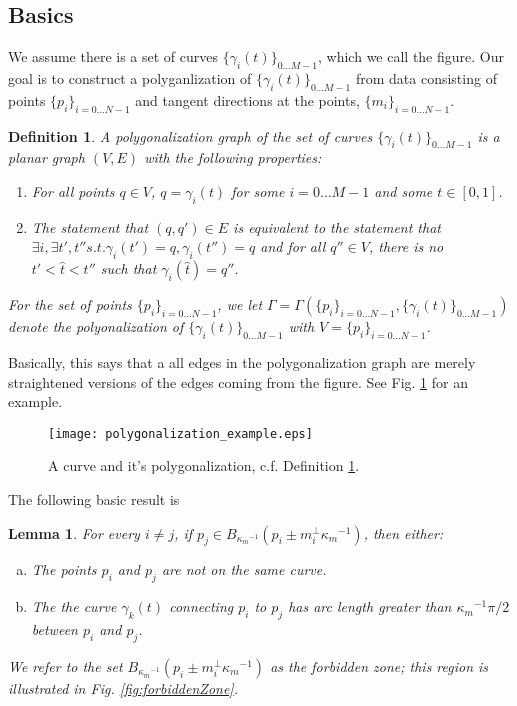 \documentclass{article}
\newtheorem{definition}[cntr]{Definition}
\newtheorem{lemma}[cntr]{Lemma}
\numberwithin{cntr}{section}
\newcommand{\Oto}[1]{{0 \ldots #1-1}}
\newcommand{\OtoN}{{0 \ldots N-1}}
\newcommand{\pointData}{{ \{ p_{i} \}_{i=\OtoN} }}
\newcommand{\tanData}{{ \{ m_{i} \}_{i=\OtoN} }}
\newcommand{\curveSet}{{ \{ \gamma_i(t) \}_{\Oto{M}}}}
\newcommand{\poly}{{\Gamma}}
\newcommand{\ball}[2]{ { B_{#1}(#2) } }
\newcommand{\kmax}{{\kappa_{m}}}
\newcommand{\kmaxi}{{\kmax^{-1}}}
\begin{document}
\subsection{Basics}

We assume there is a set of curves $\curveSet$, which we call the figure. Our goal is to construct a polyganlization of $\curveSet$ from data consisting of points $\pointData$ and tangent directions at the points, $\tanData$.

\begin{definition}
  \label{def:polygonalization}
  A polygonalization graph of the set of curves $\curveSet$ is a planar graph $(V,E)$ with the following properties:
  \begin{enumerate}
  \item For all points $q \in V$, $q=\gamma_{i}(t)$ for some $i=\Oto{M}$ and some $t \in [0,1]$.
  \item The statement that $(q,q') \in E$ is equivalent to the statement that $\exists i, \exists t', t'' s.t. \gamma_{i}(t')=q, \gamma_{i}(t'')=q$ and for all $q'' \in V$, there is no $t' < \hat{t} < t''$ such that $\gamma_{i}(\hat{t}) = q''$.
  \end{enumerate}
  For the set of points $\pointData$, we let $\poly=\poly(\pointData, \curveSet)$ denote the polyonalization of $\curveSet$ with $V=\pointData$.
\end{definition}
Basically, this says that a all edges in the polygonalization graph are merely straightened versions of the edges coming from the figure. See Fig. \ref{fig:polygonalization} for an example.

\begin{figure}
\setlength{\unitlength}{0.240900pt}
\ifx\plotpoint\undefined\newsavebox{\plotpoint}\fi
\sbox{\plotpoint}{\rule[-0.200pt]{0.400pt}{0.400pt}}%
\texttt{[image: polygonalization\_example.eps]}

\caption{A curve and it's polygonalization, c.f. Definition \ref{def:polygonalization}. }
\label{fig:polygonalization}
\end{figure}

The following basic result is
\begin{lemma}
  \label{lem:forbiddenZone}
  For every $i \neq j$, if $p_{j} \in \ball{\kmaxi}{p_{i} \pm m_{i}^{\perp} \kmaxi}$, then either:
  \begin{enumerate}[a.]
  \item The points $p_{i}$ and $p_{j}$ are not on the same curve.
  \item The the curve $\gamma_{k}(t)$ connecting $p_{i}$ to $p_{j}$ has arc length greater than $\kmaxi \pi/2$ between $p_{i}$ and $p_{j}$.
  \end{enumerate}
  We refer to the set $\ball{\kmaxi}{p_{i} \pm m_{i}^{\perp} \kmaxi}$ as the \emph{forbidden zone}; this region is illustrated in Fig. \ref{fig:forbiddenZone}.
\end{lemma}
\end{document}
